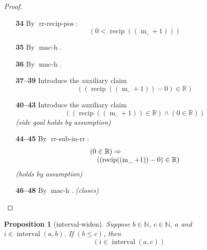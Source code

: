 \documentclass[11pt]{article}
\theoremstyle{plain}
\newtheorem{proposition}{Proposition}
\begin{document}
\begin{proof}
\begin{itemize}[leftmargin=2.8em, itemsep=4pt, parsep=1pt]
  \item[\textbf{34}] By $\operatorname{rr\text{-}recip\text{-}pos}$:
\begin{equation*}
(0 < \operatorname{recip}((\operatorname{m\_} + 1)))
\end{equation*}

  \item[\textbf{35}] By $\operatorname{mac\text{-}h}$.
  \item[\textbf{36}] By $\operatorname{mac\text{-}h}$.
  \item[\textbf{37--39}] Introduce the auxiliary claim
\begin{equation*}
((\operatorname{recip}((\operatorname{m\_} + 1)) - 0) \in \mathbb{R})
\end{equation*}

  \item[\textbf{40--43}] Introduce the auxiliary claim
\begin{equation*}
((\operatorname{recip}((\operatorname{m\_} + 1)) \in \mathbb{R}) \wedge (0 \in \mathbb{R}))
\end{equation*}
  \emph{(side goal holds by assumption)}
  \item[\textbf{44--45}] By $\operatorname{rr\text{-}sub\text{-}in\text{-}rr}$:
\begin{equation*}
\begin{array}{@{}l@{}} (0 \in \mathbb{R}) \Rightarrow  \\ \quad ((\operatorname{recip}((\operatorname{m\_} + 1)) - 0) \in \mathbb{R}) \end{array}
\end{equation*}
  \emph{(holds by assumption)}
  \item[\textbf{46--48}] By $\operatorname{mac\text{-}h}$.  \emph{(closes)}
\end{itemize}
\end{proof}

\bigskip

\begin{proposition}[interval-widen]
Suppose $b \in \mathbb{N}$, $c \in \mathbb{N}$, $a$ and $i \in \operatorname{interval}(a, b)$. If $(b \leq c)$, then 
\begin{equation*}
(i \in \operatorname{interval}(a, c))
\end{equation*}

\end{proposition}
\end{document}
